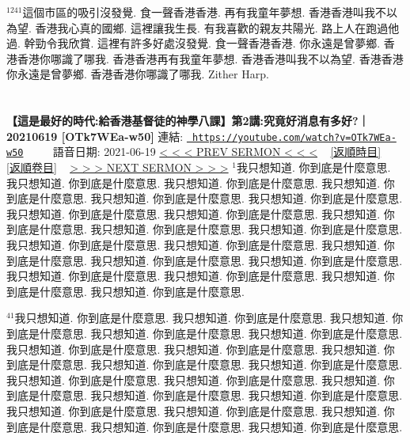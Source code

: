 \documentclass{book}
\begin{document}
$^{1241}$這個市區的吸引沒發覺.
食一聲香港香港.
再有我童年夢想.
香港香港叫我不以為望.
香港我心真的國鄉.
這裡讓我生長.
有我喜歡的親友共陽光.
路上人在跑過他過.
幹勁令我欣賞.
這裡有許多好處沒發覺.
食一聲香港香港.
你永遠是曾夢鄉.
香港香港你哪識了哪我.
香港香港再有我童年夢想.
香港香港叫我不以為望.
香港香港你永遠是曾夢鄉.
香港香港你哪識了哪我.
Zither Harp.
\newpage



\section{}
\label{sec:OTk7WEa_w50}
\textbf{【這是最好的時代:給香港基督徒的神學八課】第2講:究竟好消息有多好?｜20210619 [OTk7WEa-w50]}
\newline
\newline
連結: \href{https://youtube.com/watch?v=OTk7WEa-w50}{\texttt{ https://youtube.com/watch?v=OTk7WEa-w50}} ~~~~ 語音日期: 2021-06-19 
\newline
\newline
\hyperref[sec:adSMNfhKn24]{\small{< < < PREV SERMON < < <}}
~
\hyperref[sec:index_chronic]{\small{[返順時目]}}
~
\hyperref[sec:index_scriptual]{\small{[返順卷目]}}
~
\hyperref[sec:rjndxjSXpt8]{\small{> > > NEXT SERMON > > >}}
\newline
\newline
$^{1}$我只想知道.
你到底是什麼意思.
我只想知道.
你到底是什麼意思.
我只想知道.
你到底是什麼意思.
我只想知道.
你到底是什麼意思.
我只想知道.
你到底是什麼意思.
我只想知道.
你到底是什麼意思.
我只想知道.
你到底是什麼意思.
我只想知道.
你到底是什麼意思.
我只想知道.
你到底是什麼意思.
我只想知道.
你到底是什麼意思.
我只想知道.
你到底是什麼意思.
我只想知道.
你到底是什麼意思.
我只想知道.
你到底是什麼意思.
我只想知道.
你到底是什麼意思.
我只想知道.
你到底是什麼意思.
我只想知道.
你到底是什麼意思.
我只想知道.
你到底是什麼意思.
我只想知道.
你到底是什麼意思.
我只想知道.
你到底是什麼意思.
我只想知道.
你到底是什麼意思.

$^{41}$我只想知道.
你到底是什麼意思.
我只想知道.
你到底是什麼意思.
我只想知道.
你到底是什麼意思.
我只想知道.
你到底是什麼意思.
我只想知道.
你到底是什麼意思.
我只想知道.
你到底是什麼意思.
我只想知道.
你到底是什麼意思.
我只想知道.
你到底是什麼意思.
我只想知道.
你到底是什麼意思.
我只想知道.
你到底是什麼意思.
我只想知道.
你到底是什麼意思.
我只想知道.
你到底是什麼意思.
我只想知道.
你到底是什麼意思.
我只想知道.
你到底是什麼意思.
我只想知道.
你到底是什麼意思.
我只想知道.
你到底是什麼意思.
我只想知道.
你到底是什麼意思.
我只想知道.
你到底是什麼意思.
我只想知道.
你到底是什麼意思.
我只想知道.
你到底是什麼意思.
\end{document}
